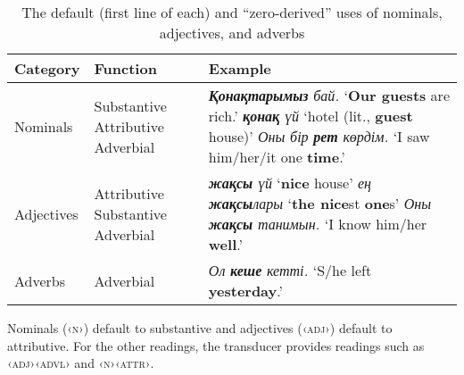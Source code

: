 \documentclass[a4paper,11pt, onecolumn,twoside]{article}
\newcommand{\kazakh}[1]{{\em #1}}
\newcommand{\sgloss}[1]{\hspace{0.5em}`#1'}
\newcommand{\tag}[1]{{\ll \textsc{‹#1›}}}
\begin{document}
\begin{table}[htbp]
	\centering
	\caption{The default (first line of each) and ``zero-derived'' uses of nominals, adjectives, and adverbs}\label{tab:zeroderiv}
	{\small
	\begin{tabular}{lp{5em}p{21em}}
		\toprule
			\textbf{Category} & \textbf{Function} & \textbf{Example} \\
		\midrule
			Nominals & Substantive\newline
							Attributive\newline
							Adverbial
						& \kazakh{\textbf{Қонақтарымыз} бай.} \sgloss{\textbf{Our guests} are rich.}\newline 
							\kazakh{\textbf{қонақ} үй} \sgloss{hotel (lit., \textbf{guest} house)}\newline
							\kazakh{Оны бір \textbf{рет} көрдім.} \sgloss{I saw him/her/it one \textbf{time}.} \\\midrule
			Adjectives & Attributive\newline
							Substantive\newline
							Adverbial
						& \kazakh{\textbf{жақсы} үй} \sgloss{\textbf{nice} house} \newline
						\kazakh{ең \textbf{жақсы}лары} \sgloss{\textbf{the nice}st \textbf{one}s} \newline
						\kazakh{Оны \textbf{жақсы} танимын.} \sgloss{I know him/her \textbf{well}.}
						\\\midrule
			Adverbs & Adverbial
						& \kazakh{Ол \textbf{кеше} кетті.} \sgloss{S/he left \textbf{yesterday}.}
						\\
		\bottomrule
	\end{tabular}
	}

\end{table}

Nominals (\tag{n}) default to substantive and adjectives (\tag{adj}) default to attributive.  For the other readings, the transducer provides readings such as \tag{adj}\tag{advl} and \tag{n}\tag{attr}.

\end{document}
